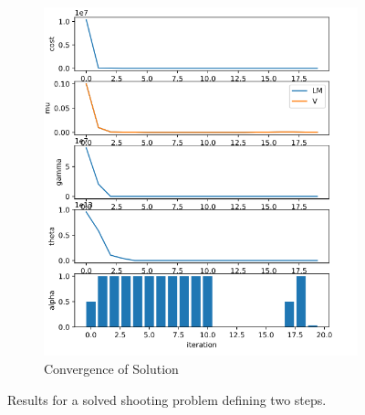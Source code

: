 \begin{figure}[h!]
\begin{subfigure}{.4\textwidth}
  \includegraphics[width=1\linewidth]{Media/Crocoddyl/RH5Legs/2Steps/RH52Steps_Convergence.png}
  \caption{Convergence of Solution}
\end{subfigure}
\caption{Results for a solved shooting problem defining two steps.}
\label{fig:rh5_two_steps}
\centering
\end{figure}

